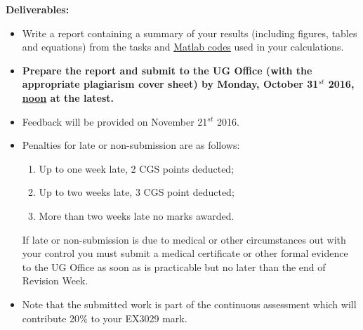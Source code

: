 \documentclass[12pts,a4paper,amsmath,amssymb,floatfix]{article}%
\begin{document}
{\bf Deliverables:}
\begin{itemize}
     \item Write a report containing a summary of your results (including figures, tables and equations) from the tasks and \underline{Matlab codes} used in your calculations. 
%
     \item {\bf Prepare the report and submit to the UG Office (with the appropriate plagiarism cover sheet) by Monday, October 31$^{st}$ 2016, \underline{noon} at the latest.}
%
     \item Feedback will be provided on November 21$^{st}$ 2016.
%
     \item Penalties for late or non-submission are as follows:
        \begin{enumerate}%
            \item Up to one week late, 2 CGS points deducted;
            \item Up to two weeks late, 3 CGS point deducted;
            \item More than two weeks late no marks awarded.
        \end{enumerate}
        If late or non-submission is due to medical or other circumstances out with your control you must submit a medical certificate or other formal evidence to the UG Office as soon as is practicable but no later than the end of Revision Week.
%

%
    \item Note that the submitted work is part of the continuous assessment which will contribute 20$\%$ to your EX3029 mark.
%
\end{itemize}
\end{document}

